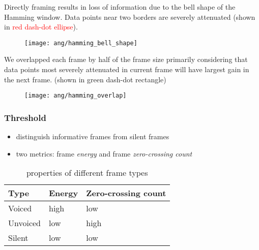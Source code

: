 
\begin{frame}
Directly framing results in loss of information due to the bell shape of the Hamming window. Data points near two borders are severely attenuated (shown in \textcolor{red}{red dash-dot ellipse}).
\begin{figure}[H]
\centering
\texttt{[image: ang/hamming\_bell\_shape]}
\end{figure}
\end{frame}


\begin{frame}
We overlapped each frame by half of the frame size primarily considering that data points most severely attenuated in current frame will have largest gain in the next frame. (shown in \textcolor{green_html}{green dash-dot rectangle})
\begin{figure}[H]
\centering
\texttt{[image: ang/hamming\_overlap]}
\end{figure}
\end{frame}


\begin{frame}
\frametitle{Threshold}
\begin{itemize}
\item distinguish informative frames from silent frames
\item two metrics: frame \textit{energy} and frame \textit{zero-crossing count}
\end{itemize}

\begin{table}[H]
\centering
\caption{properties of different frame types}
\begin{tabu} to 0.9\textwidth {X[c]X[c]X[c]}
\toprule
Type &Energy &Zero-crossing count\\
\hline
Voiced &high &low\\
\hline
Unvoiced &low &high\\
\hline
Silent &low &low\\
\bottomrule
\end{tabu}
\end{table}
\end{frame}

